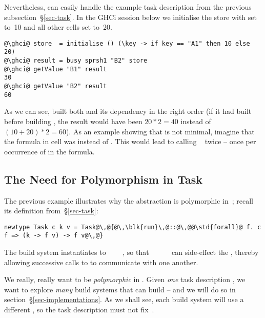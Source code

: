 Nevertheless,  can easily handle the example task description
 from the previous subsection~\S\ref{sec-task}. In the GHCi session
below we initialise the store with  set to~10 and all other cells set
to~20.

\begin{verbatim}
@\ghci@ store  = initialise () (\key -> if key == "A1" then 10 else 20)
@\ghci@ result = busy sprsh1 "B2" store
@\ghci@ getValue "B1" result
30
@\ghci@ getValue "B2" result
60
\end{verbatim}

\noindent
As we can see,  built both  and its dependency  in the
right order (if it had built  before building , the result would
have been $20 * 2 = 40$ instead of $(10 + 20) * 2 = 60$). As an example showing
that  is not minimal, imagine that the formula in cell  was
 instead of . This would lead to calling
~ twice -- once per occurrence of  in the
formula.

\subsection{The Need for Polymorphism in Task}\label{sec-why-polymorphism}

The previous example illustrates why the  abstraction is polymorphic
in~; recall its definition from~\S\ref{sec-task}:

\begin{verbatim}
newtype Task c k v = Task@\,@{@\,\blk{run}\,@::@\,@@\std{forall}@ f. c f => (k -> f v) -> f v@\,@}
\end{verbatim}

\noindent
The  build system instantiates  to
~~~~,
so that ~\hs{::}~~\hs{->}~~ can side-effect the
, thereby allowing successive calls to  to communicate with
one another.

We really, really want  to be \emph{polymorphic} in .
Given \emph{one} task description , we want to explore \emph{many} build
systems that can build  -- and we will do so in
section~\S\ref{sec-implementations}. As we shall see, each build system will use
a different , so the task description must not fix~.

